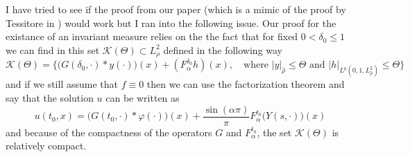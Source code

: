 \documentclass[a4paper,11pt]{article}
\theoremstyle{plain}
\theoremstyle{definition}
\numberwithin{NQ}{section}
\numberwithin{LQ}{section}
\numberwithin{ZQ}{section}
\begin{document}
I have tried to see if the proof from our paper (which is a mimic of the proof by Tessitore in \cite{TessitoreZabczyk98M}) would work but I ran into the following issue. Our proof for the existance of an invariant measure relies on the the fact that for fixed $0<\delta_0 \le 1$ we can find in this set $\mathscr K(\Theta) \subset L^2_\rho$ defined in the following way 
$$ \mathscr K (\Theta) = \{ \big(G(\delta_0,\cdot)*y(\cdot)\big)(x)+(F^{\delta_0}_\alpha h)(x), \quad \text{where $|y|_{\hat\rho} \le \Theta$  and  $|h|_{L^q(0,1,L^2_{\hat \rho})} \le \Theta $} \} $$
and if we still assume that $f\equiv 0$ then we can use the factorization theorem and say that the solution $u$ can be written as 
$$ u(t_0,x)=\big( G(t_0,\cdot)*\varphi(\cdot) \big)(x)+\dfrac{\sin(\alpha \pi)}{\pi}F_\alpha^{t_0}\big(Y(s,\cdot)\big)(x)$$
and because of the compactness of the operators $G$ and $F_\alpha^{t_0}$, the set $\mathscr K(\Theta)$ is relatively compact. 
\end{document}
